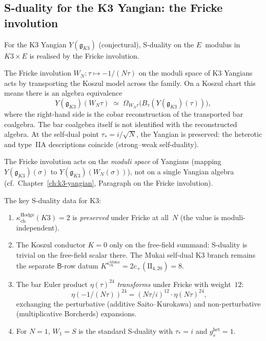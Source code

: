 \subsection{S-duality for the K3 Yangian: the Fricke involution}
\label{subsec:fricke-s-duality}

For the K3 Yangian $Y(\mathfrak{g}_{K3})$ (conjectural), S-duality on the $E$~modulus in $K3 \times E$ is realised by the Fricke involution.

\begin{conjecture}[Fricke = S-duality on K3 Yangian moduli]
\label{conj:fricke-s-duality}
\ClaimStatusConjectured
The Fricke involution $W_N \colon \tau \mapsto -1/(N\tau)$ on the moduli
space of K3 Yangians acts by transporting the Koszul model across the
family. On a Koszul chart this means there is an algebra equivalence
\[
 Y(\mathfrak{g}_{K3})(W_N\tau)
 \;\simeq\;
 \Omega_{W_N\tau}\!\bigl(B_\tau(Y(\mathfrak{g}_{K3})(\tau))\bigr),
\]
where the right-hand side is the cobar reconstruction of the transported
bar coalgebra. The bar coalgebra itself is not identified with the
reconstructed algebra.
At the self-dual point $\tau_* = i/\sqrt{N}$, the Yangian is preserved: the heterotic and type~IIA descriptions coincide (strong--weak self-duality).
\end{conjecture}

The Fricke involution acts on the \emph{moduli space} of Yangians (mapping $Y(\mathfrak{g}_{K3})(\sigma)$ to $Y(\mathfrak{g}_{K3})(W_N(\sigma))$), not on a single Yangian algebra (cf.\ Chapter~\ref{ch:k3-yangian}, Paragraph on the Fricke involution).

The key S-duality data for K3:
\begin{enumerate}[label=(\roman*)]
 \item $\kappa_{\mathrm{ch}}^{\mathrm{Hodge}}(K3) = 2$ is \emph{preserved} under Fricke at all~$N$ (the value is moduli-independent).
 \item The Koszul conductor $K = 0$ only on the free-field summand: S-duality is trivial on the free-field scalar there. The Mukai self-dual K3 branch remains the separate $\mathsf{B}$-row datum $K^{\kappa_{\mathrm{ch}}^{\mathrm{Mukai}}}=2c_+(\mathrm{II}_{4,20})=8$.
 \item The bar Euler product $\eta(\tau)^{24}$ \emph{transforms} under Fricke with weight~$12$:
 \[
 \eta(-1/(N\tau))^{24} = (N\tau/i)^{12} \cdot \eta(N\tau)^{24},
 \]
 exchanging the perturbative (additive Saito--Kurokawa) and non-perturbative (multiplicative Borcherds) expansions.
 \item For $N = 1$, $W_1 = S$ is the standard S-duality with $\tau_* = i$ and $g_s^{\mathrm{het}} = 1$.
\end{enumerate}

